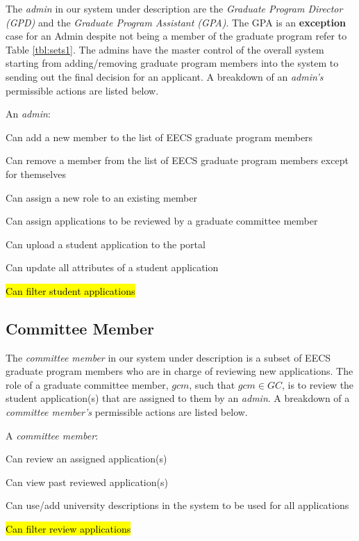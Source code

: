 \documentclass[fontsize=12pt,paper=letter,twoside]{scrartcl}
\begin{document}
The \emph{admin} in our system under description are  the \emph{Graduate Program Director (GPD)} and the \emph{Graduate Program Assistant (GPA)}. The GPA is an \textbf{exception} case for an Admin despite not being a member of the graduate program refer to Table \ref{tbl:sets1}. The admins have the master control of the overall system starting from adding/removing graduate program members into the system to sending out the final decision for an applicant. A breakdown of an \emph{admin's} permissible actions are listed below.

\smallskip
\noindent An \emph{admin}:

\begin{mylist}
\item Can add a new member to the list of EECS graduate program members
\item Can remove a member from the list of EECS graduate program members except for themselves
\item Can assign a new role to an existing member
\item Can assign applications to be reviewed by a graduate committee member
\item Can upload a student application to the portal
\item Can update all attributes of a student application
\item \hl{Can filter student applications}
\end{mylist}

\subsection{Committee Member}

The \emph{committee member} in our system under description is a subset of EECS graduate program members who are in charge of reviewing new applications. The role of a graduate committee member, $gcm$, such that $gcm \in GC$, is to review the student application(s) that are assigned to them by an \emph{admin}. A breakdown of a \emph{committee member's} permissible actions are listed below.

\smallskip
\noindent A \emph{committee member}:

\begin{mylist}
\item Can review an assigned application(s)
\item Can view past reviewed application(s)
\item Can use/add university descriptions in the system to be used for all applications
\item \hl{Can filter review applications}
\end{mylist}
\end{document}
